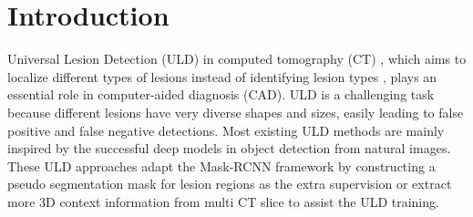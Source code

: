 \documentclass[runningheads]{llncs}
\newcommand{\ucite}[1]{\cite{#1}} 
\begin{document}
\section{Introduction}\label{sec:introduction}
Universal Lesion Detection (ULD)  in computed tomography (CT) \ucite{zlocha2019one-stage,tao2019improving,zhang2019anchor_free,zhang2020Agg_Fas,tang2019uldor,yan20183DCE,li2019mvp,yan2019mulan,yang2020alignshift,cai2020deep,li2020bounding,zhang2020revisiting,yan2020learning}, which aims to localize different types of lesions instead of identifying lesion types \ucite{liao2019evaluate,lin2019automated,wang2019volumetric,astaraki2019normal,tang2019nodulenet,shao2019attentive,liu20193dfpn,boot2020diagnostic,yu2020deep,fan2020positive,yu2020computer,de2020multi}, plays an essential role in computer-aided  diagnosis (CAD). ULD is a challenging task because different lesions have very diverse shapes and sizes, easily leading to false positive and false negative detections. Most existing ULD methods are mainly inspired by the successful deep models in object detection from natural images. These ULD approaches adapt the Mask-RCNN \cite{he2017maskrcnn} framework by constructing a pseudo segmentation mask for lesion regions as the extra supervision\ucite{zlocha2019one-stage,tao2019improving,tang2019uldor,yan2019mulan,yang2020alignshift,yan2020learning} or extract more 3D context information from multi CT slice\ucite{zhang2019anchor_free,zhang2020Agg_Fas,yan20183DCE,li2019mvp,yan2019mulan,yang2020alignshift,cai2020deep,zhang2020revisiting} to assist the ULD training.
\end{document}
